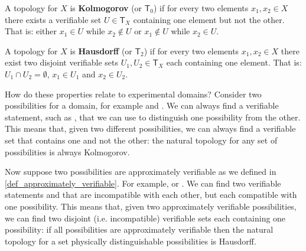 \documentclass[11pt,letterpaper,fleqn]{memoir} %
\begin{document}
\begin{mathSection}
	\begin{defn}
		A topology for $X$ is \textbf{Kolmogorov} (or $\mathsf{T}_0$) if for every two elements $x_1, x_2 \in X$ there exists a verifiable set $U \in \mathsf{T}_X$ containing one element but not the other. That is: either $x_1 \in U$ while $x_2 \notin U$ or $x_1 \notin U$ while $x_2 \in U$.
	\end{defn}
	\begin{defn}
	A topology for $X$ is \textbf{Hausdorff} (or $\mathsf{T}_2$) if for every two elements $x_1, x_2 \in X$ there exist two disjoint verifiable sets $U_1, U_2 \in \mathsf{T}_X$ each containing one element. That is: $U_1 \cap U_2 = \emptyset$, $x_1 
	\in U_1$ and $x_2 \in U_2$.
\end{defn}

\end{mathSection}

How do these properties relate to experimental domains? Consider two possibilities for a domain, for example  and . We can always find a verifiable statement, such as , that we can use to distinguish one possibility from the other. This means that, given two different possibilities, we can always find a verifiable set that contains one and not the other: the natural topology for any set of possibilities is always Kolmogorov.

Now suppose two possibilities are approximately verifiable as we defined in \ref{def_approximately_verifiable}. For example,  or . We can find two verifiable statements  and  that are incompatible with each other, but each compatible with one possibility. This means that, given two approximately verifiable possibilities, we can find two disjoint (i.e. incompatible) verifiable sets each containing one possibility: if all possibilities are approximately verifiable then the natural topology for a set physically distinguishable possibilities is Hausdorff.
\end{document}
